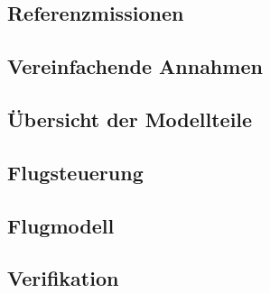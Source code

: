 \subsection{Referenzmissionen}


\subsection{Vereinfachende Annahmen}

	
\subsection{Übersicht der Modellteile}

	
\subsection{Flugsteuerung}

	
\subsection{Flugmodell}


\subsection{Verifikation}

